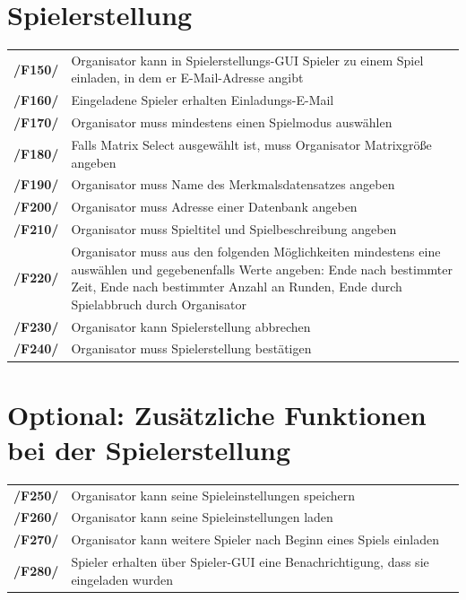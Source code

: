 \documentclass[a4paper]{scrreprt}
\begin{document}
    \section{Spielerstellung}
    \begin{tabularx}{\linewidth}{@{}>{\bfseries}l@{\hspace{.5em}}X@{}} 
    /F150/ & \Gls{Organisator} kann in Spielerstellungs-GUI \Gls{Spieler} zu einem \Gls{Spiel} einladen, in dem er E-Mail-Adresse angibt \\
    /F160/ & Eingeladene \Gls{Spieler} erhalten Einladungs-E-Mail \\
    /F170/ & \Gls{Organisator} muss mindestens einen \Gls{Spielmodus} auswählen \\
    /F180/ & Falls \Gls{Matrix Select} ausgewählt ist, muss \Gls{Organisator} Matrixgröße angeben \\
    /F190/ & \Gls{Organisator} muss Name des Merkmalsdatensatzes angeben \\
    /F200/ & \Gls{Organisator} muss Adresse einer Datenbank angeben \\ %
    /F210/ & \Gls{Organisator} muss Spieltitel und Spielbeschreibung angeben \\ %
    /F220/ & \Gls{Organisator} muss aus den folgenden Möglichkeiten mindestens eine auswählen und gegebenenfalls Werte angeben: Ende nach bestimmter Zeit, Ende nach bestimmter Anzahl an Runden, Ende durch Spielabbruch durch Organisator \\
    /F230/ & \Gls{Organisator} kann Spielerstellung abbrechen \\
    /F240/ & \Gls{Organisator} muss Spielerstellung bestätigen \\
    \end{tabularx}
    
    \section{Optional: Zusätzliche Funktionen bei der Spielerstellung}
    \begin{tabularx}{\linewidth}{@{}>{\bfseries}l@{\hspace{.5em}}X@{}}
    /F250/ & \Gls{Organisator} kann seine \Gls{Spieleinstellungen} speichern \\
    /F260/ & \Gls{Organisator} kann seine \Gls{Spieleinstellungen} laden \\
    /F270/ & \Gls{Organisator} kann weitere \Gls{Spieler} nach Beginn eines \Gls{Spiel}s einladen \\
    /F280/ & \Gls{Spieler} erhalten über Spieler-GUI eine Benachrichtigung, dass sie eingeladen wurden \\ %
	\end{tabularx}
    
\end{document}
